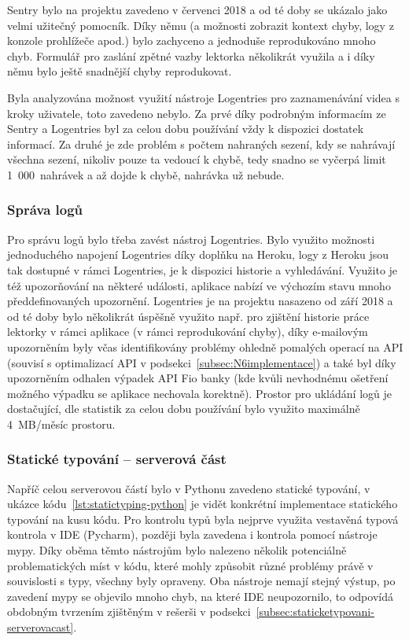 Sentry bylo na projektu zavedeno v červenci 2018 a od té doby se ukázalo jako velmi užitečný pomocník. Díky němu (a možnosti zobrazit kontext chyby, logy z konzole prohlížeče apod.) bylo zachyceno a jednoduše reprodukováno mnoho chyb. Formulář pro zaslání zpětné vazby lektorka několikrát využila a i díky němu bylo ještě snadnější chyby reprodukovat.

Byla analyzována možnost využití nástroje Logentries pro zaznamenávání videa s kroky uživatele, toto zavedeno nebylo. Za prvé díky podrobným informacím ze Sentry a Logentries byl za celou dobu používání vždy k dispozici dostatek informací. Za druhé je zde problém s počtem nahraných sezení, kdy se nahrávají všechna sezení, nikoliv pouze ta vedoucí k chybě, tedy snadno se vyčerpá limit 1~000~nahrávek a až dojde k chybě, nahrávka už nebude.

\subsubsection{Správa logů}

Pro správu logů bylo třeba zavést nástroj Logentries. Bylo využito možnosti jednoduchého napojení Logentries díky doplňku na Heroku, logy z Heroku jsou tak dostupné v rámci Logentries, je k dispozici historie a vyhledávání. Využito je též upozorňování na některé události, aplikace nabízí ve výchozím stavu mnoho předdefinovaných upozornění. Logentries je na projektu nasazeno od září 2018 a od té doby bylo několikrát úspěšně využito např. pro zjištění historie práce lektorky v rámci aplikace (v rámci reprodukování chyby), díky e-mailovým upozorněním byly včas identifikovány problémy ohledně pomalých operací na API (souvisí s optimalizací API v podsekci~\ref{subsec:N6implementace}) a také byl díky upozorněním odhalen výpadek API Fio banky (kde kvůli nevhodnému ošetření možného výpadku se aplikace nechovala korektně). Prostor pro ukládání logů je dostačující, dle statistik za celou dobu používání bylo využito maximálně 4~MB/měsíc prostoru.

\subsubsection{Statické typování -- serverová část}

Napříč celou serverovou částí bylo v Pythonu zavedeno statické typování, v ukázce kódu~\ref{lst:statictyping-python} je vidět konkrétní implementace statického typování na kusu kódu. Pro kontrolu typů byla nejprve využita vestavěná typová kontrola v IDE (Pycharm), později byla zavedena i kontrola pomocí nástroje mypy. Díky oběma těmto nástrojům bylo nalezeno několik potenciálně problematických míst v kódu, které mohly způsobit různé problémy právě v souvislosti s typy, všechny byly opraveny. Oba nástroje nemají stejný výstup, po zavedení mypy se objevilo mnoho chyb, na které IDE neupozornilo, to odpovídá obdobným tvrzením zjištěným v rešerši v podsekci~\ref{subsec:staticketypovani-serverovacast}. 

